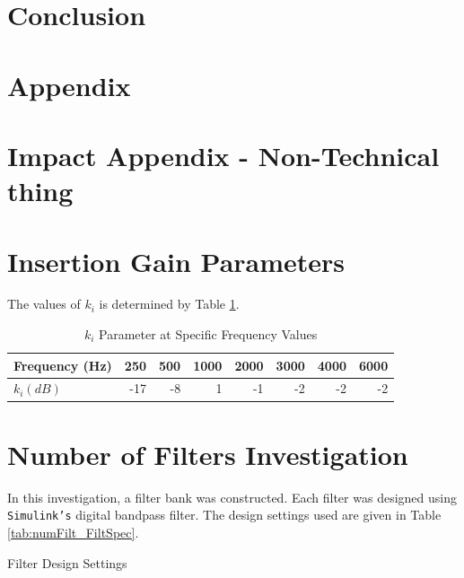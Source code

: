 \documentclass[11pt,onecolumn]{witseiepaper}
\begin{document}
\section{Conclusion}
\newpage
\printbibliography
\newpage
\section*{Appendix}
\begin{appendices}

\section{Impact Appendix - Non-Technical thing}


\section{Insertion Gain Parameters}
\label{app:insertGainParam}

\noindent The values of $k_i$ is determined by Table \ref{tab:kiVal}.

\begin{table}[htbp]
  \centering
  \caption{$k_i$ Parameter at Specific Frequency Values}
    \begin{tabular}{|l|r|r|r|r|r|r|r|}
    \hline
    \textbf{Frequency (Hz)} & 250   & 500   & 1000  & 2000  & 3000  & 4000  & 6000 \\
    \hline
    \textbf{$k_i (dB)$} & -17   & -8    & 1     & -1    & -2    & -2    & -2 \\
    \hline
    \end{tabular}%
  \label{tab:kiVal}%
\end{table}%


\section{Number of Filters Investigation}
\label{app:numFilt}

\noindent In this investigation, a filter bank was constructed. Each filter was designed using \texttt{Simulink's} digital bandpass filter. The design settings used are given in Table \ref{tab:numFilt_FiltSpec}.

\begin{table}[htbp]
  \centering
  \caption{Filter Design Settings}
  

\end{table}
\end{appendices}
\end{document}

